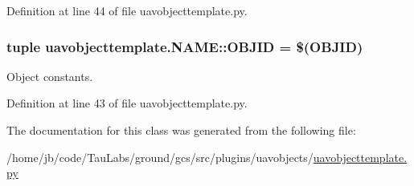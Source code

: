 \-Definition at line 44 of file uavobjecttemplate.\-py.

\hypertarget{classuavobjecttemplate_1_1_n_a_m_e_a82049c81486660578e43d32818270eb6}{
\subsubsection[{\-O\-B\-J\-I\-D}]{\setlength{\rightskip}{0pt plus 5cm}tuple {\bf uavobjecttemplate.\-N\-A\-M\-E\-::\-O\-B\-J\-I\-D} = \$({\bf \-O\-B\-J\-I\-D})}}\label{classuavobjecttemplate_1_1_n_a_m_e_a82049c81486660578e43d32818270eb6}


\-Object constants. 



\-Definition at line 43 of file uavobjecttemplate.\-py.



\-The documentation for this class was generated from the following file\-:\begin{DoxyCompactItemize}
\item 
/home/jb/code/\-Tau\-Labs/ground/gcs/src/plugins/uavobjects/\hyperlink{uavobjecttemplate_8py}{uavobjecttemplate.\-py}\end{DoxyCompactItemize}

